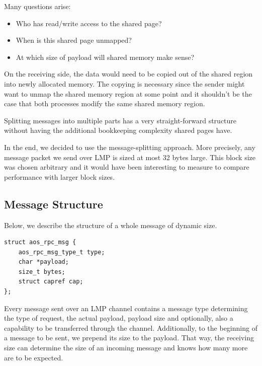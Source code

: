 Many questions arise:
\begin{itemize}
    \item Who has read/write access to the shared page? 
    \item When is this shared page unmapped?
    \item At which size of payload will shared memory make sense?
\end{itemize}
On the receiving side, the data would need to be copied out of the shared region 
into newly allocated memory. The copying is necessary since the sender 
might want to unmap the shared memory region at some point and it shouldn't be 
the case that both processes modify the same shared memory region.

Splitting messages into multiple parts has a very straight-forward structure 
without having the additional bookkeeping complexity shared pages have.


In the end, we decided to use the message-splitting approach.
More precisely, any message packet we send over LMP is sized at most 32 bytes
large. This block size was chosen arbitrary and it would have been interesting to measure
to compare performance with larger block sizes.

\subsection{Message Structure}
Below, we describe the structure of a whole message of dynamic size.
\begin{verbatim}
struct aos_rpc_msg {
    aos_rpc_msg_type_t type;
    char *payload;
    size_t bytes;
    struct capref cap;
};
\end{verbatim}
Every message sent over an LMP channel contains a message type determining 
the type of request, the actual payload, payload size and optionally, 
also a capability to be transferred through the channel. 
Additionally, to the beginning of a message to be sent, we prepend its size 
to the payload. That way, the receiving size can determine the size of an 
incoming message and knows how many more are to be expected.

